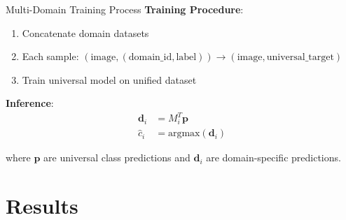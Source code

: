 \documentclass[aspectratio=169]{beamer}
\begin{document}
\begin{frame}{Multi-Domain Training Process}
    \textbf{Training Procedure}:
    \begin{enumerate}
        \item Concatenate domain datasets
        \item Each sample: $(\text{image}, (\text{domain\_id}, \text{label})) \rightarrow (\text{image}, \text{universal\_target})$
        \item Train universal model on unified dataset
    \end{enumerate}

    \vspace{1em}

    \textbf{Inference}:
    \begin{align}
        \mathbf{d}_i & = M_i^T \mathbf{p}            \\
        \hat{c}_i    & = \text{argmax}(\mathbf{d}_i)
    \end{align}

    where $\mathbf{p}$ are universal class predictions and $\mathbf{d}_i$ are domain-specific predictions.
\end{frame}

\section{Results}
\end{document}
